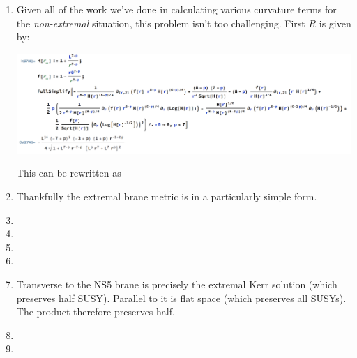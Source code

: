 \documentclass[11pt, class=article, crop=false]{standalone}
\begin{document}
\begin{enumerate}
	\item Given all of the work we've done in calculating various curvature terms for the \emph{non-extremal} situation, this problem isn't too challenging.
	First $R$ is given by:
	\begin{center}
		\includegraphics[scale=0.5]{"Figures/R"}
	\end{center}
	This can be rewritten as

	\item Thankfully the extremal brane metric is in a particularly simple form. 
	
	\item
	
	\item
	
	\item
	
	\item
	
	\item Transverse to the NS5 brane is precisely the extremal Kerr solution (which preserves half SUSY). Parallel to it is flat space (which preserves all SUSYs). The product therefore preserves half.
	
	\item 
	
	\item
	
		
\end{enumerate}

\end{document}

